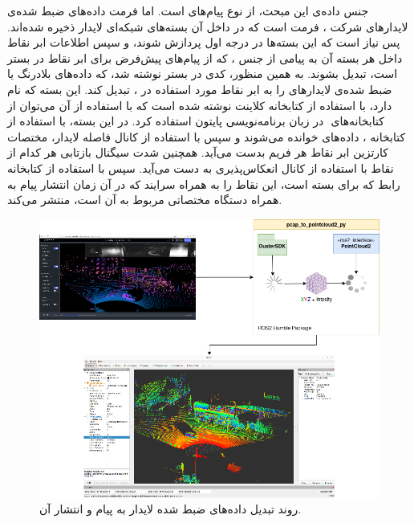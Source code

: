 جنس داده‌‌ی این مبحث، از نوع پیام‌های  است. اما فرمت داده‌های ضبط شده‌ی لایدارهای شرکت ، فرمت  است که در داخل آن بسته‌های شبکه‌ای لایدار ذخیره شده‌اند. پس نیاز است که این بسته‌ها در درجه اول پردازش شوند، و سپس اطلاعات ابر نقاط داخل هر بسته آن به پیامی از جنس ، که از پیام‌های پیش‌فرض برای ابر نقاط در بستر  است، تبدیل بشوند. به همین منظور، کدی در بستر  نوشته شد، که داده‌های بلادرنگ یا ضبط‌ شده‌ی لایدار‌های  را به ابر نقاط مورد استفاده در ، تبدیل کند. 
این بسته  که  نام دارد، با استفاده از کتابخانه کلاینت  نوشته شده است که با استفاده از آن می‌توان از کتابخانه‌های ‌ در زبان برنامه‌نویسی پایتون استفاده کرد. در این بسته، با استفاده از کتابخانه ، داده‌های  خوانده می‌شوند و سپس با استفاده از کانال فاصله لایدار، مختصات کارتزین ابر نقاط هر فریم بدست می‌آید. همچنین شدت سیگنال بازتابی هر کدام از نقاط با استفاده از کانال انعکاس‌پذیری به دست می‌آید. سپس با استفاده از کتابخانه رابط  که برای بسته  است، این نقاط را به همراه سرایند که در آن زمان انتشار پیام به همراه دستگاه مختصاتی مربوط به آن است، منتشر می‌کند.

\begin{figure}[h!]
    \centering
    \includegraphics[width=1\linewidth]{figures/pcap_to_pointcloud2.png}
    \caption{روند تبدیل داده‌های ضبط شده لایدار به پیام  و انتشار آن.}
    \label{fig:pcap_to_pointcloud2}
\end{figure}

